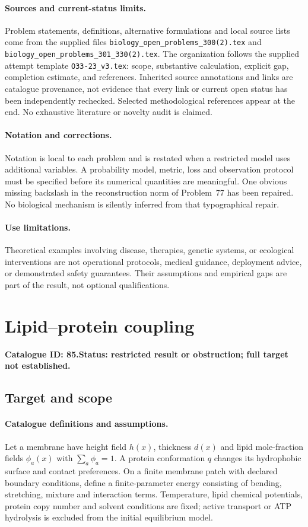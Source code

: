 \documentclass[11pt]{article}
\begin{document}
\paragraph{Sources and current-status limits.}
Problem statements, definitions, alternative formulations and local source lists
come from the supplied files
\texttt{biology\_open\_problems\_300(2).tex} and
\texttt{biology\_open\_problems\_301\_330(2).tex}.
The organization follows the supplied attempt template
\texttt{O33-23\_v3.tex}: scope, substantive calculation, explicit gap,
completion estimate, and references. Inherited source annotations and links are
catalogue provenance, not evidence that every link or current open status has
been independently rechecked. Selected methodological references appear at the
end. No exhaustive literature or novelty audit is claimed.

\paragraph{Notation and corrections.}
Notation is local to each problem and is restated when a restricted model uses
additional variables. A probability model, metric, loss and observation protocol
must be specified before its numerical quantities are meaningful. One obvious
missing backslash in the reconstruction norm of Problem~77 has been repaired.
No biological mechanism is silently inferred from that typographical repair.

\paragraph{Use limitations.}
Theoretical examples involving disease, therapies, genetic systems, or ecological
interventions are not operational protocols, medical guidance, deployment advice,
or demonstrated safety guarantees. Their assumptions and empirical gaps are part
of the result, not optional qualifications.

\setcounter{section}{84}
\section{Lipid--protein coupling}
\label{prob:085}
\noindent\textbf{Catalogue ID: 85.}\quad \textbf{Status: restricted result or obstruction; full target not established.}
\subsection{Target and scope}
\paragraph{Catalogue definitions and assumptions.}
Let a membrane have height field $h(x)$, thickness $d(x)$ and lipid mole-fraction fields $\phi_a(x)$ with $\sum_a\phi_a=1$. A protein conformation $q$ changes its hydrophobic surface and contact preferences. On a finite membrane patch with declared boundary conditions, define a finite-parameter energy consisting of bending, stretching, mixture and interaction terms. Temperature, lipid chemical potentials, protein copy number and solvent conditions are fixed; active transport or ATP hydrolysis is excluded from the initial equilibrium model.
\end{document}
